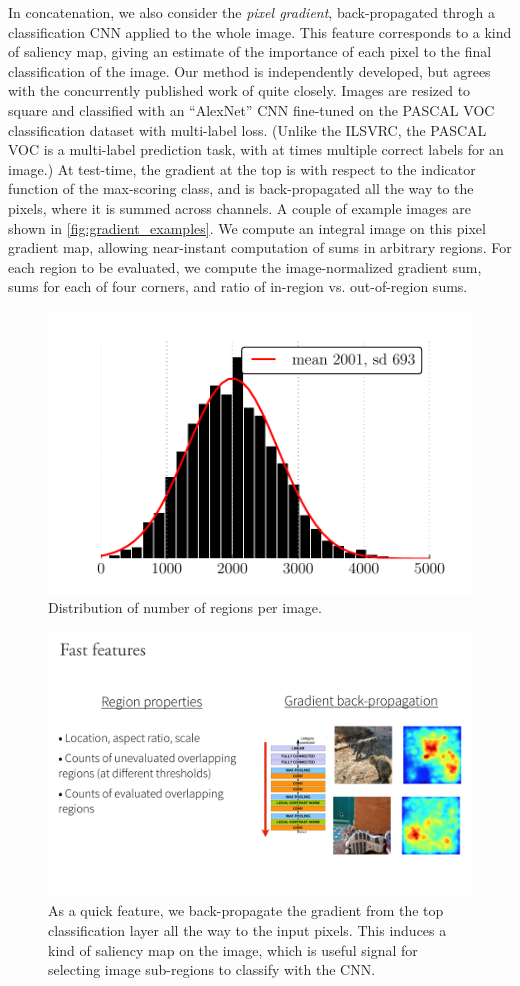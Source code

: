 In concatenation, we also consider the \emph{pixel gradient}, back-propagated throgh a classification CNN applied to the whole image.
This feature corresponds to a kind of saliency map, giving an estimate of the importance of each pixel to the final classification of the image.
Our method is independently developed, but agrees with the concurrently published work of \cite{Simonyan-ICLR-2014} quite closely.
Images are resized to square and classified with an ``AlexNet'' \cite{Krizhevsky-NIPS-2012} CNN fine-tuned on the PASCAL VOC classification dataset with multi-label loss.
(Unlike the ILSVRC, the PASCAL VOC is a multi-label prediction task, with at times multiple correct labels for an image.)
At test-time, the gradient at the top is with respect to the indicator function of the max-scoring class, and is back-propagated all the way to the pixels, where it is summed across channels.
A couple of example images are shown in \autoref{fig:gradient_examples}.
We compute an integral image on this pixel gradient map, allowing near-instant computation of sums in arbitrary regions.
For each region to be evaluated, we compute the image-normalized gradient sum, sums for each of four corners, and ratio of in-region vs. out-of-region sums.

\begin{figure}
\centering
\includegraphics[width=.66\linewidth]{../ccnn/figures/roi_hist.pdf}
\caption{
Distribution of number of regions per image.
}\label{fig:roi_hist}
\end{figure}

\begin{figure}
\centering
\includegraphics[width=.66\linewidth]{../../figures/gradient_backprop.pdf}
\caption[Explanation of the gradient back-propagation quick feature.]{
As a quick feature, we back-propagate the gradient from the top classification layer all the way to the input pixels.
This induces a kind of saliency map on the image, which is useful signal for selecting image sub-regions to classify with the CNN.
}\label{fig:gradient_examples}
\end{figure}

